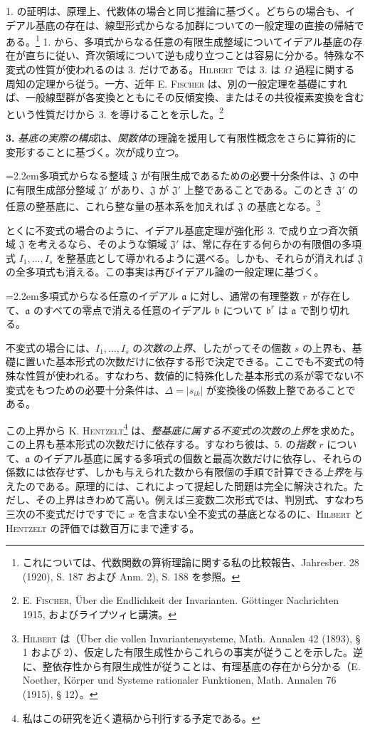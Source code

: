 \documentclass[11pt]{article}
\newcommand{\D}{\Delta}
\newcommand{\ma}{\mathfrak a}
\newcommand{\mb}{\mathfrak b}
\newcommand{\mJ}{\mathfrak J}
\newcommand{\PXXIIIitem}[2]{\par\noindent\hangindent=2.2em\hangafter=1\makebox[2.2em][l]{#1.}#2\par}
\begin{document}
1. の証明は、原理上、代数体の場合と同じ推論に基づく。どちらの場合も、イデアル基底の存在は、線型形式からなる加群についての一般定理の直接の帰結である。\footnote{これについては、代数関数の算術理論に関する私の比較報告、Jahresber. 28 (1920), S. 187 および Anm. 2), S. 188 を参照。} 1. から、多項式からなる任意の有限生成整域についてイデアル基底の存在が直ちに従い、斉次領域について逆も成り立つことは容易に分かる。特殊な不変式の性質が使われるのは 3. だけである。\textsc{Hilbert} では 3. は $\Omega$ 過程に関する周知の定理から従う。一方、近年 E. \textsc{Fischer} は、別の一般定理を基礎にすれば、一般線型群が各変換とともにその反傾変換、またはその共役複素変換を含むという性質だけから 3. を導けることを示した。\footnote{E. \textsc{Fischer}, Über die Endlichkeit der Invarianten. Göttinger Nachrichten 1915, およびライプツィヒ講演。}

\textbf{3.} \emph{基底の実際の構成}は、\emph{関数体}の理論を援用して有限性概念をさらに算術的に変形することに基づく。次が成り立つ。
\PXXIIIitem{4}{多項式からなる整域 $\mJ$ が有限生成であるための必要十分条件は、$\mJ$ の中に有限生成部分整域 $\mJ'$ があり、$\mJ$ が $\mJ'$ 上整であることである。このとき $\mJ'$ の任意の整基底に、これら整な量の基本系を加えれば $\mJ$ の基底となる。\footnote{\textsc{Hilbert} は（Über die vollen Invariantensysteme, Math. Annalen 42 (1893), § 1 および 2）、仮定した有限生成性からこれらの事実が従うことを示した。逆に、整依存性から有限生成性が従うことは、有理基底の存在から分かる（E. Noether, Körper und Systeme rationaler Funktionen, Math. Annalen 76 (1915), § 12）。}}
とくに不変式の場合のように、イデアル基底定理が強化形 3. で成り立つ斉次領域 $\mJ$ を考えるなら、そのような領域 $\mJ'$ は、常に存在する何らかの有限個の多項式 $I_1,\ldots,I_s$ を整基底として導かれるように選べる。しかも、それらが消えれば $\mJ$ の全多項式も消える。この事実は再びイデアル論の一般定理に基づく。
\PXXIIIitem{5}{多項式からなる任意のイデアル $\ma$ に対し、通常の有理整数 $r$ が存在して、$\ma$ のすべての零点で消える任意のイデアル $\mb$ について $\mb^r$ は $\ma$ で割り切れる。}

不変式の場合には、$I_1,\ldots,I_s$ の\emph{次数の上界}、したがってその個数 $s$ の上界も、基礎に置いた基本形式の次数だけに依存する形で決定できる。ここでも不変式の特殊な性質が使われる。すなわち、数値的に特殊化した基本形式の系が零でない不変式をもつための必要十分条件は、$\D=|s_{ik}|$ が変換後の係数上整であることである。

この上界から K. \textsc{Hentzelt}\footnote{私はこの研究を近く遺稿から刊行する予定である。} は、\emph{整基底に属する不変式の次数の上界}を求めた。この上界も基本形式の次数だけに依存する。すなわち彼は、5. の\emph{指数} $r$ について、$\ma$ のイデアル基底に属する多項式の個数と最高次数だけに依存し、それらの係数には依存せず、しかも与えられた数から有限個の手順で計算できる\emph{上界}を与えたのである。原理的には、これによって提起した問題は完全に解決された。ただし、その上界はきわめて高い。例えば三変数二次形式では、判別式、すなわち三次の不変式だけですでに $x$ を含まない全不変式の基底となるのに、\textsc{Hilbert} と \textsc{Hentzelt} の評価では数百万にまで達する。
\end{document}

